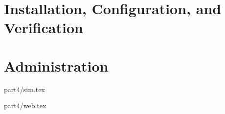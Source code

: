 % 
% 
% 
% 

\ifpdf
\else
{}
\fi
\chapter{Installation, Configuration, and Verification}


\ifpdf
\else
{}
\fi
\chapter{Administration}














 {part4/sim.tex}

 {part4/web.tex}
